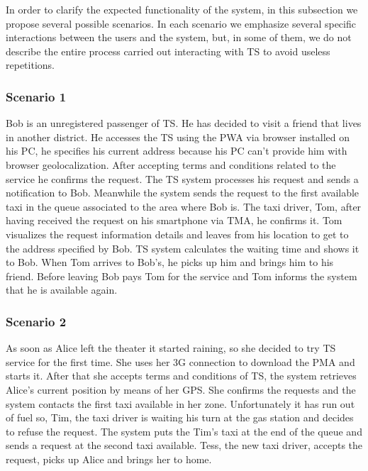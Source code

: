 In order to clarify the expected functionality of the system, in this
subsection we propose several possible scenarios. In each scenario
we emphasize several specific interactions between the users and the
system, but, in some of them, we do not describe the entire process
carried out interacting with TS to avoid useless repetitions.


\subsubsection{Scenario 1}

Bob is an unregistered passenger of TS. He has decided to visit a
friend that lives in another district. He accesses the TS using the
PWA via browser installed on his PC, he specifies his current address
because his PC can’t provide him with browser geolocalization. After
accepting terms and conditions related to the service he confirms
the request. The TS system processes his request and sends a notification
to Bob. Meanwhile the system sends the request to the first available
taxi in the queue associated to the area where Bob is. The taxi driver,
Tom, after having received the request on his smartphone via TMA,
he confirms it. Tom visualizes the request information details and
leaves from his location to get to the address specified by Bob. TS
system calculates the waiting time and shows it to Bob. When Tom arrives
to Bob's, he picks up him and brings him to his friend. Before leaving
Bob pays Tom for the service and Tom informs the system that he is
available again.


\subsubsection{Scenario 2}

As soon as Alice left the theater it started raining, so she decided
to try TS service for the first time. She uses her 3G connection to
download the PMA and starts it. After that she accepts terms and conditions
of TS, the system retrieves Alice’s current position by means of her
GPS. She confirms the requests and the system contacts the first taxi
available in her zone. Unfortunately it has run out of fuel so, Tim,
the taxi driver is waiting his turn at the gas station and decides
to refuse the request. The system puts the Tim’s taxi at the end of
the queue and sends a request at the second taxi available. Tess,
the new taxi driver, accepts the request, picks up Alice and brings
her to home.


